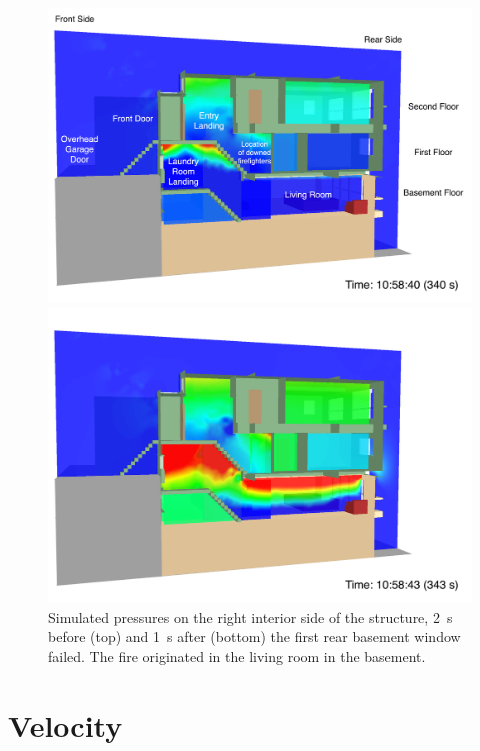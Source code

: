 \documentclass[12pt,oneside]{book}
\begin{document}
\begin{figure}[!ht]
\includegraphics[width=5.5in]{../Figures/SMV_Pres_340_s}

\includegraphics[width=5.5in]{../Figures/SMV_Pres_343_s}

\caption[Simulated pressures on the right interior side of the structure.]
{Simulated pressures on the right interior side of the structure, 2~s before (top) and 1~s after (bottom) the first rear basement window failed. The fire originated in the living room in the basement.}
\label{fig:smv_pressure}
\end{figure}


\clearpage


\section{Velocity}
\label{sec:velocity}
\end{document}
